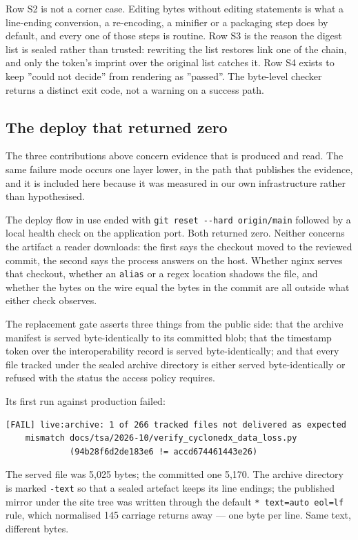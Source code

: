 Row S2 is not a corner case. Editing bytes without editing statements is what a
line-ending conversion, a re-encoding, a minifier or a packaging step does by
default, and every one of those steps is routine. Row S3 is the reason the
digest list is sealed rather than trusted: rewriting the list restores link one
of the chain, and only the token's imprint over the original list catches it.
Row S4 exists to keep ''could not decide'' from rendering as ''passed''. The
byte-level checker returns a distinct exit code, not a warning on a success
path.

\subsection{The deploy that returned zero}
\label{sec:eval-deploy}

The three contributions above concern evidence that is produced and read. The
same failure mode occurs one layer lower, in the path that publishes the
evidence, and it is included here because it was measured in our own
infrastructure rather than hypothesised.

The deploy flow in use ended with \texttt{git reset -{}-hard origin/main} followed
by a local health check on the application port. Both returned zero. Neither
concerns the artifact a reader downloads: the first says the checkout moved to
the reviewed commit, the second says the process answers on the host. Whether
nginx serves that checkout, whether an \texttt{alias} or a regex location
shadows the file, and whether the bytes on the wire equal the bytes in the commit
are all outside what either check observes.

The replacement gate asserts three things from the public side: that the archive
manifest is served byte-identically to its committed blob; that the timestamp
token over the interoperability record is served byte-identically; and that
every file tracked under the sealed archive directory is either served
byte-identically or refused with the status the access policy requires.

Its first run against production failed:

\begin{lstlisting}
[FAIL] live:archive: 1 of 266 tracked files not delivered as expected
    mismatch docs/tsa/2026-10/verify_cyclonedx_data_loss.py
             (94b28f6d2de183e6 != accd674461443e26)
\end{lstlisting}

The served file was 5{,}025 bytes; the committed one 5{,}170. The archive
directory is marked \texttt{-text} so that a sealed artefact keeps its line
endings; the published mirror under the site tree was written through the
default \texttt{* text=auto eol=lf} rule, which normalised 145 carriage returns
away --- one byte per line. Same text, different bytes.


